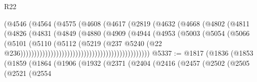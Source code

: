\begin{lexlean}{R22}
\begin{coremodule}
                                              (@4546
                                                (@4564
                                                  (@4575
                                                    (@4608
                                                      (@4617
                                                        (@2819
                                                          (@4632
                                                            (@4668
                                                              (@4802
                                                                (@4811
                                                                  (@4826
                                                                    (@4831
                                                                      (@4849
                                                                        (@4880
                                                                          (@4909
                                                                            (@4944
                                                                              (@4953
                                                                                (@5003
                                                                                  (@5054
                                                                                    (@5066
                                                                                      (@5101
                                                                                        (@5110
                                                                                          (@5112
                                                                                            (@5219
                                                                                              (@237
                                                                                                @5240
                                                                                                (@22
                                                                                                  @236)))))))))))))))))))))))))))))))))))))))))))))))
@5337 := @1817
    (@1836
      (@1853
        (@1859
          (@1864
            (@1906
              (@1932
                (@2371
                  (@2404
                    (@2416
                      (@2457
                        (@2502
                          (@2505
                            (@2521
                              (@2554

\end{coremodule}
\end{lexlean}
